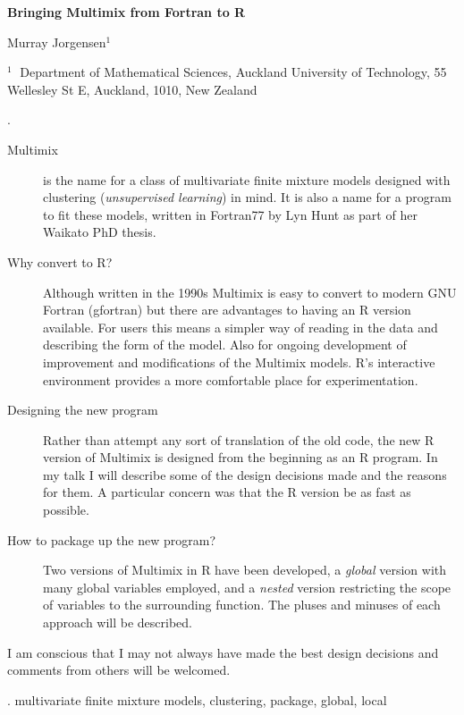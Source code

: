\documentclass[12pt]{article}
\begin{document}
\begin{flushleft}


{\LARGE\bf Bringing Multimix from Fortran to R}


\vspace{1.0cm}

Murray Jorgensen$^1$ 

\begin{description}

\item $^1 \;$ Department of Mathematical Sciences, Auckland University of Technology,
 55 Wellesley St E, Auckland, 1010, New Zealand
 
\end{description}

\end{flushleft}

\vspace{0.50cm}

. 
\begin{description}
\item[ Multimix]  is the name for a class of multivariate finite mixture models designed with clustering ({\it unsupervised learning}) in mind. It is also a name for a program to fit these models, written in Fortran77 by Lyn Hunt as part of her Waikato PhD thesis.
\item[ Why convert to R?] 
Although written in the 1990s Multimix is easy to convert to modern GNU Fortran (gfortran) but there are advantages to having an R version available. For users this means a simpler way of reading in the data and describing the form of the model. Also for ongoing development of improvement and modifications of the Multimix models. R's interactive environment provides a more comfortable place for experimentation.
\item[Designing the new program] Rather than attempt any sort of translation of the old code, the new R version of Multimix is designed from the beginning as an R program. In my talk I will describe some of the design decisions made and the reasons for them. A particular concern was that the R version be as fast as possible.
\item[ How to package up the new program?] Two versions of Multimix in R have been developed, a {\em global} version with many global variables employed, and a {\em nested} version restricting the scope of variables to the surrounding function. The pluses and minuses of each approach will be described.
\end{description}
I am conscious that I may not always have made the best design decisions and comments from others will be welcomed.

\vskip 2mm
.
multivariate finite mixture models, clustering, package, global, local
\end{document}
